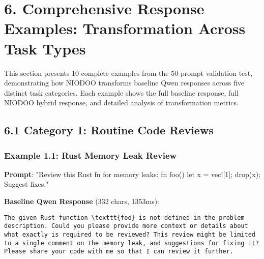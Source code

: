 \documentclass[11pt,a4paper]{article}
\begin{document}
\section{6. Comprehensive Response Examples: Transformation Across Task Types}

This section presents 10 complete examples from the 50-prompt validation test, demonstrating how NIODOO transforms baseline Qwen responses across five distinct task categories. Each example shows the full baseline response, full NIODOO hybrid response, and detailed analysis of transformation metrics.

\subsection{6.1 Category 1: Routine Code Reviews}

\subsubsection{Example 1.1: Rust Memory Leak Review}

\textbf{Prompt}: "Review this Rust fn for memory leaks: fn foo() { let x = vec![1]; drop(x); } Suggest fixes."

\textbf{Baseline Qwen Response} (332 chars, 1353ms):
\begin{verbatim}The given Rust function \texttt{foo} is not defined in the problem description. Could you please provide more context or details about what exactly is required to be reviewed? This review might be limited to a single comment on the memory leak, and suggestions for fixing it? Please share your code with me so that I can review it further.
\end{verbatim}
\end{document}
